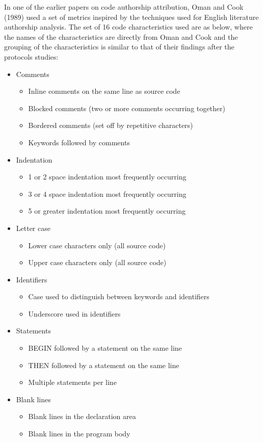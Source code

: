 \documentclass{report}
\begin{document}
In one of the earlier papers on code authorship attribution, Oman and Cook (1989) used a set of metrics inspired by the techniques used for English literature authorship analysis. The set of 16 code characteristics used are as below, where the names of the characteristics are directly from Oman and Cook and the grouping of the characteristics is similar to that of their findings after the protocols studies:

\begin{itemize}
\item Comments
\begin{itemize}
\item Inline comments on the same line as source code
\item Blocked comments (two or more comments occurring together)
\item Bordered comments (set off by repetitive characters)
\item Keywords followed by comments
\end{itemize}
\item Indentation
\begin{itemize}
\item 1 or 2 space indentation most frequently occurring
\item 3 or 4 space indentation most frequently occurring
\item 5 or greater indentation most frequently occurring
\end{itemize}
\item Letter case
\begin{itemize}
\item Lower case characters only (all source code)
\item Upper case characters only (all source code)
\end{itemize}
\item Identifiers
\begin{itemize}
\item Case used to distinguish between keywords and identifiers
\item Underscore used in identifiers
\end{itemize}
\item Statements
\begin{itemize}
\item BEGIN followed by a statement on the same line
\item THEN followed by a statement on the same line
\item Multiple statements per line
\end{itemize}
\item Blank lines
\begin{itemize}
\item Blank lines in the declaration area
\item Blank lines in the program body
\end{itemize}
\end{itemize}
\end{document}
